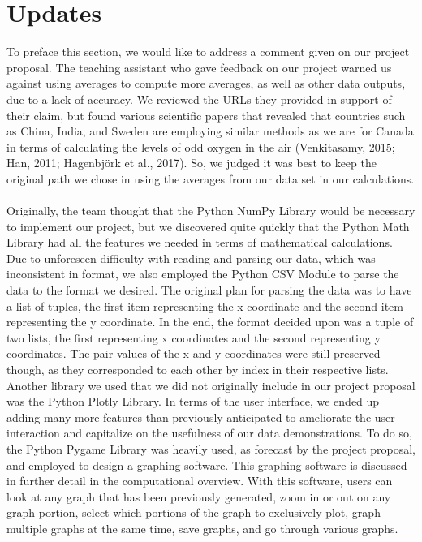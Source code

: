 \documentclass[fontsize=11pt]{article}
\begin{document}
\section*{Updates}

\qquad To preface this section, we would like to address a comment given on our project proposal. The teaching assistant who gave feedback on our project warned us against using averages to compute more averages, as well as other data outputs, due to a lack of accuracy. We reviewed the URLs they provided in support of their claim, but found various scientific papers that revealed that countries such as China, India, and Sweden are employing similar methods as we are for Canada in terms of calculating the levels of odd oxygen in the air (Venkitasamy, 2015; Han, 2011;  Hagenbjörk et al., 2017). So, we judged it was best to keep the original path we chose in using the averages from our data set in our calculations.\\

\\ Originally, the team thought that the Python NumPy Library would be necessary to implement our project, but we discovered quite quickly that the Python Math Library had all the features we needed in terms of mathematical calculations. Due to unforeseen difficulty with reading and parsing our data, which was inconsistent in format, we also employed the Python CSV Module to parse the data to the format we desired. The original plan for parsing the data was to have a list of tuples, the first item representing the x coordinate and the second item representing the y coordinate. In the end, the format decided upon was a tuple of two lists, the first representing x coordinates and the second representing y coordinates. The pair-values of the x and y coordinates were still preserved though, as they corresponded to each other by index in their respective lists. Another library we used that we did not originally include in our project proposal was the Python Plotly Library. In terms of the user interface, we ended up adding many more features than previously anticipated to ameliorate the user interaction and capitalize on the usefulness of our data demonstrations. To do so, the Python Pygame Library was heavily used, as forecast by the project proposal, and employed to design a graphing software. This graphing software is discussed in further detail in the computational overview. With this software, users can look at any graph that has been previously generated, zoom in or out on any graph portion, select which portions of the graph to exclusively plot, graph multiple graphs at the same time, save graphs, and go through various graphs.\\ 
	
\end{document}

